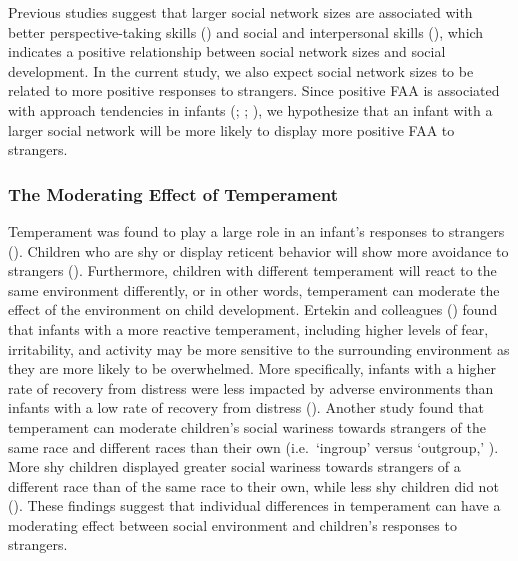 \documentclass[
  man,
  floatsintext,
  longtable,
  nolmodern,
  notxfonts,
  notimes,
  colorlinks=true,linkcolor=blue,citecolor=blue,urlcolor=blue]{apa7}
\begin{document}
Previous studies suggest that larger social network sizes are associated
with better perspective-taking skills
() and
social and interpersonal skills
(),
which indicates a positive relationship between social network sizes and
social development. In the current study, we also expect social network
sizes to be related to more positive responses to strangers. Since
positive FAA is associated with approach tendencies in infants
(;
;
),
we hypothesize that an infant with a larger social network will be more
likely to display more positive FAA to strangers.

\subsubsection{The Moderating Effect of
Temperament}\label{sec-moderating-effect-of-temperament}

Temperament was found to play a large role in an infant's responses to
strangers (). Children who are shy or display reticent behavior will show
more avoidance to strangers
().
Furthermore, children with different temperament will react to the same
environment differently, or in other words, temperament can moderate the
effect of the environment on child development. Ertekin and colleagues
() found that
infants with a more reactive temperament, including higher levels of
fear, irritability, and activity may be more sensitive to the
surrounding environment as they are more likely to be overwhelmed. More
specifically, infants with a higher rate of recovery from distress were
less impacted by adverse environments than infants with a low rate of
recovery from distress
(). Another study found that temperament can moderate children's
social wariness towards strangers of the same race and different races
than their own (i.e.~`ingroup' versus `outgroup,'
).
More shy children displayed greater social wariness towards strangers of
a different race than of the same race to their own, while less shy
children did not (). These findings suggest that individual differences in
temperament can have a moderating effect between social environment and
children's responses to strangers.
\end{document}
